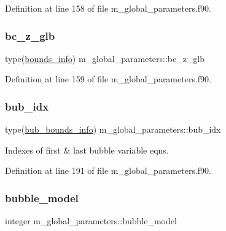 Definition at line 158 of file m\+\_\+global\+\_\+parameters.\+f90.

\mbox{\label{namespacem__global__parameters_aeb29c88b4fa96ec8edcfed6c42861280}} 
\subsubsection{\texorpdfstring{bc\+\_\+z\+\_\+glb}{bc\_z\_glb}}
{\footnotesize\ttfamily type(\hyperlink{structm__derived__types_1_1bounds__info}{bounds\+\_\+info}) m\+\_\+global\+\_\+parameters\+::bc\+\_\+z\+\_\+glb}



Definition at line 159 of file m\+\_\+global\+\_\+parameters.\+f90.

\mbox{\label{namespacem__global__parameters_a9a425d1bd91d1765043adf8410b98bf7}} 
\subsubsection{\texorpdfstring{bub\+\_\+idx}{bub\_idx}}
{\footnotesize\ttfamily type(\hyperlink{structm__derived__types_1_1bub__bounds__info}{bub\+\_\+bounds\+\_\+info}) m\+\_\+global\+\_\+parameters\+::bub\+\_\+idx}



Indexes of first \& last bubble variable eqns. 



Definition at line 191 of file m\+\_\+global\+\_\+parameters.\+f90.

\mbox{\label{namespacem__global__parameters_aef0de5da0e41de495e9fe67accd62d77}} 
\subsubsection{\texorpdfstring{bubble\+\_\+model}{bubble\_model}}
{\footnotesize\ttfamily integer m\+\_\+global\+\_\+parameters\+::bubble\+\_\+model}



